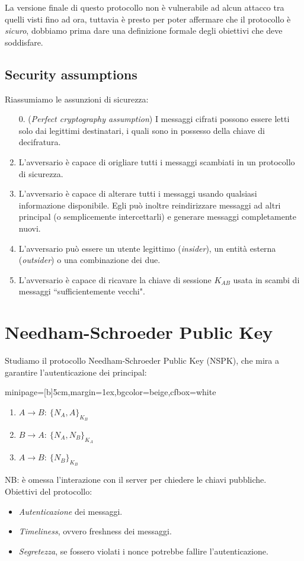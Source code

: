 \documentclass[a4paper, 11pt, twoside, openright, fleqn]{report}
\newcommand{\fromto}[2]{#1\rightarrow #2\!:\ }
\newenvironment{colbox}[2]%
{%
	\par\noindent\hspace{10pt}
	\begin{adjustbox}{minipage=[b]{#2},margin=1ex,bgcolor=#1,cfbox=white}
}{%
	\end{adjustbox}\newline%
}
\begin{document}
La versione finale di questo protocollo non è vulnerabile ad alcun attacco tra quelli visti fino ad ora, tuttavia è presto per poter affermare che il protocollo è \emph{sicuro}, dobbiamo prima dare una definizione formale degli obiettivi che deve soddisfare.

\subsection{Security assumptions}
Riassumiamo le assunzioni di sicurezza:
\begin{enumerate}
	\item[0.] (\emph{Perfect cryptography assumption}) I messaggi cifrati possono essere letti solo dai legittimi destinatari, i quali sono in possesso della chiave di decifratura.
	\item L'avversario è capace di origliare tutti i messaggi scambiati in un protocollo di sicurezza.
	\item L'avversario è capace di alterare tutti i messaggi usando qualsiasi informazione disponibile. Egli può inoltre reindirizzare messaggi ad altri principal (o semplicemente intercettarli) e generare messaggi completamente nuovi.
	\item L'avversario può essere un utente legittimo (\emph{insider}), un entità esterna (\emph{outsider}) o una combinazione dei due.
	\item L'avversario è capace di ricavare la chiave di sessione $K_{AB}$ usata in scambi di messaggi ``sufficientemente vecchi".
\end{enumerate}

\clearpage
\section{Needham-Schroeder Public Key}
Studiamo il protocollo Needham-Schroeder Public Key (NSPK), che mira a garantire l'autenticazione dei principal:
\begin{colbox}{beige}{5cm}
	\begin{enumerate}
		\item $\fromto{A}{B}\{N_A,A\}_{K_B}$
		\item $\fromto{B}{A}\{N_A,N_B\}_{K_A}$
		\item $\fromto{A}{B}\{N_B\}_{K_B}$
	\end{enumerate}
\end{colbox}
NB: è omessa l'interazione con il server per chiedere le chiavi pubbliche.\\
Obiettivi del protocollo:
\begin{itemize}
	\item \emph{Autenticazione} dei messaggi.
	\item \emph{Timeliness}, ovvero freshness dei messaggi.
	\item \emph{Segretezza}, se fossero violati i nonce potrebbe fallire l'autenticazione.
\end{itemize}
\end{document}

